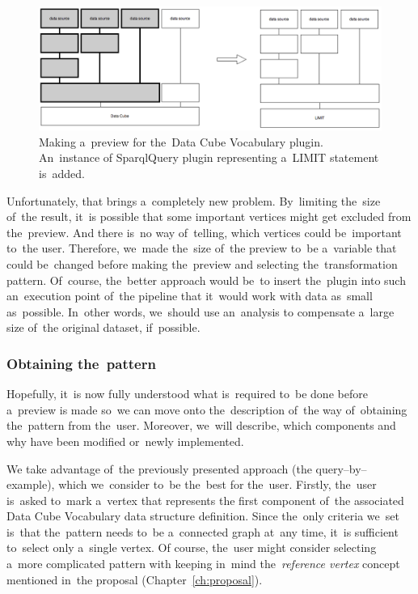 \begin{figure}
	\centering
	\includegraphics[width=140mm]{img/dcv-extraction-limit.png}
	\caption{Making a~preview for the~Data Cube Vocabulary plugin. An~instance of
	SparqlQuery plugin representing a~LIMIT statement is~added.}
	\label{fig:dcv-extraction-limit}
\end{figure}

Unfortunately, that brings a~completely new problem. By~limiting the~size of~the result, it~is possible that some important vertices might get excluded from the~preview.
And there is~no way of~telling, which vertices could be~important to~the user. Therefore, we~made the~size of~the preview to~be a~variable that could be~changed before making the~preview and 
selecting the~transformation pattern. Of~course, the~better approach would be~to 
insert the~plugin into such an~execution point of~the pipeline that it~would 
work with data as~small as~possible. In~other words, we~should use an~analysis 
to compensate a~large size of~the original dataset, if~possible.



\subsubsection{Obtaining the~pattern}
Hopefully, it~is now fully understood what is~required to~be done before a~preview 
is made so~we can move onto the~description of~the way of~obtaining the~pattern 
from the~user. Moreover, we~will describe, which components and why have been 
modified or~newly implemented.

\begin{sloppypar}
We take advantage of~the previously presented approach (the query--by--example), which we~consider to~be the~best for the~user. Firstly, the~user is~asked to~mark a~vertex that represents
the first component of~the associated Data Cube Vocabulary data structure 
definition. Since the~only criteria we~set is~that the~pattern needs to~be a~connected graph at~any time, it~is sufficient to~select only a~single vertex.
Of course, the~user might consider selecting a~more complicated pattern with keeping in~mind the~\emph{reference vertex} concept mentioned in~the proposal (Chapter~\ref{ch:proposal}).
\end{sloppypar}

